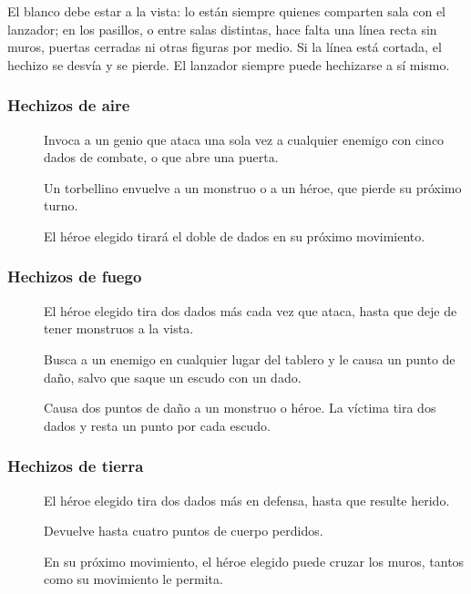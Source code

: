 El blanco debe estar a la vista: lo están siempre quienes comparten sala
con el lanzador; en los pasillos, o entre salas distintas, hace falta una
línea recta sin muros, puertas cerradas ni otras figuras por medio. Si la
línea está cortada, el hechizo se desvía y se pierde. El lanzador siempre
puede hechizarse a sí mismo.

\subsubsection*{Hechizos de aire}
\begin{description}
\item[] Invoca a un genio que ataca una sola vez a cualquier
  enemigo con cinco dados de combate, o que abre una puerta.
\item[] Un torbellino envuelve a un monstruo o a un héroe,
  que pierde su próximo turno.
\item[] El héroe elegido tirará el doble de dados en su
  próximo movimiento.
\end{description}

\subsubsection*{Hechizos de fuego}
\begin{description}
\item[] El héroe elegido tira dos dados más cada vez que ataca,
  hasta que deje de tener monstruos a la vista.
\item[] Busca a un enemigo en cualquier lugar del
  tablero y le causa un punto de daño, salvo que saque un escudo con un
  dado.
\item[] Causa dos puntos de daño a un monstruo o héroe.
  La víctima tira dos dados y resta un punto por cada escudo.
\end{description}

\subsubsection*{Hechizos de tierra}
\begin{description}
\item[] El héroe elegido tira dos dados más en defensa,
  hasta que resulte herido.
\item[] Devuelve hasta cuatro puntos de cuerpo
  perdidos.
\item[] En su próximo movimiento, el héroe elegido
  puede cruzar los muros, tantos como su movimiento le permita.
\end{description}

